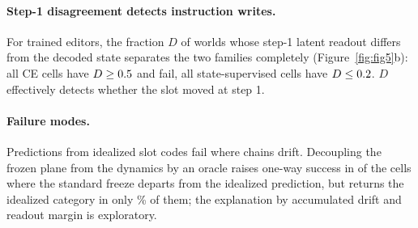 \paragraph{Step-1 disagreement detects instruction writes.}
For trained editors, the fraction $D$ of worlds whose step-1 latent readout differs from the decoded state separates the two families
completely (Figure~\ref{fig:fig5}b): all \CLnineCE{} CE cells have $D\ge0.5$ and fail, all \CLnineState{} state-supervised cells have
$D\le0.2$. $D$ effectively detects whether the slot moved at step 1.

\paragraph{Failure modes.}
Predictions from idealized slot codes fail where chains drift. Decoupling the frozen plane from the dynamics by an oracle raises
one-way success in \CLtwelveUp{} of the \CLtwelveC{} cells where the standard freeze departs from the idealized prediction, but returns
the idealized category in only \CLtwelveIdealPct{}\% of them; the explanation by accumulated drift and readout margin is exploratory.

